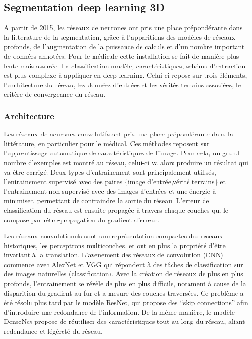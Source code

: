 \subsection{Segmentation deep learning 3D}
\label{sec:EA:segmentation_deep3D}

A partir de 2015, les réseaux de neurones ont pris une place prépondérante dans la litterature de la segmentation, grâce à l'apparitions des modèles de réseaux profonds, de l'augmentation de la puissance de calculs et d'un nombre important de données annotées. Pour le médicale cette installation se fait de manière plus lente mais assurée. La classification  modèle, caractéristiques, schéma d'extraction est plus complexe à appliquer en deep learning. Celui-ci repose sur trois éléments, l'architecture du réseau, les données d'entrées et les vérités terrains associées, le critère de convergeance du réseau.

\subsubsection{Architecture}
Les réseaux de neurones convolutifs ont pris une place prépondérante dans la littérature, en particulier pour le médical. Ces méthodes reposent sur l'apprentissage automatique de caractéristiques de l'image. Pour cela, un grand nombre d'exemples est montré au réseau, celui-ci va alors produire un résultat qui va être corrigé. Deux types d'entrainement sont principalement utilisés, l'entrainement supervisé avec des paires \{image d'entrée,vérité terrains\} et l'entrainement non supervisé avec des images d'entrées et une énergie à minimiser, permettant de contraindre la sortie du réseau. L'erreur de classification du réseau est ensuite propagée à travers chaque couches qui le compose par rétro-propagation du gradient d'erreur.

Les réseaux convolutionels sont une représentation compactes des réseaux historiques, les perceptrons multicouches, et ont en plus la propriété d'être invariant à la translation.
L'avenement des réseaux de convolution (CNN) commence avec AlexNet et VGG qui répondent à des tâches de classification sur des images naturelles (classification). Avec la création de réseaux de plus en plus profonds, l'entrainement se révèle de plus en plus difficile, notament à cause de la disparition du gradient au fur et a mesure des couches traversées. Ce problème a été résolu plus tard par le modèle ResNet, qui propose des ``skip connections'' afin d'introduire une redondance de l'information. De la même manière, le modèle DenseNet propose de réutiliser des caractéristiques tout au long du réseau, aliant redondance et légèreté du réseau.


